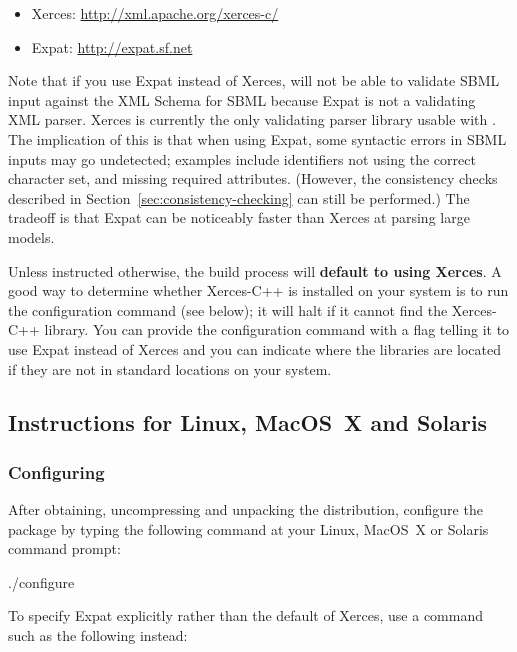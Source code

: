 \documentclass{sbmlmanual}
\begin{document}
\begin{itemize}\setlength{\parskip}{-0.25ex}

\item Xerces: \url{http://xml.apache.org/xerces-c/}
\item Expat: \url{http://expat.sf.net}

\end{itemize}

Note that if you use Expat instead of Xerces, \libsbml{} will not be able
to validate SBML input against the XML Schema for SBML because Expat is not
a validating XML parser.  Xerces is currently the only validating parser
library usable with \libsbml{}.  The implication of this is that when using
Expat, some syntactic errors in SBML inputs may go undetected; examples
include identifiers not using the correct character set, and missing
required attributes.  (However, the \libsbml{} consistency checks described
in Section~\ref{sec:consistency-checking} can still be performed.)  The
tradeoff is that Expat can be noticeably faster than Xerces at parsing
large models.

Unless instructed otherwise, the \libsbml{} build process will
\textbf{default to using Xerces}.  A good way to determine whether
Xerces-C++ is installed on your system is to run the configuration command
(see below); it will halt if it cannot find the Xerces-C++ library.  You
can provide the configuration command with a flag telling it to use Expat
instead of Xerces and you can indicate where the libraries are located if
they are not in standard locations on your system.
  

\subsection{Instructions for Linux, MacOS~X and Solaris}

\subsubsection{Configuring \libsbml{}}

After obtaining, uncompressing and unpacking the \libsbml{} distribution,
configure the package by typing the following command at your Linux,
MacOS~X or Solaris command prompt:

\begin{example}[csh]
  ./configure
\end{example}

To specify Expat explicitly rather than the \libsbml{} default of Xerces,
use a command such as the following instead:
\end{document}
